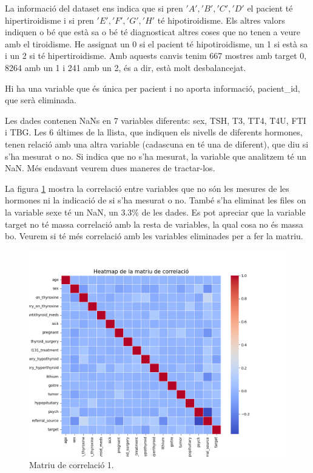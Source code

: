 \documentclass[9pt,a4paper,twoside]{tau-class/tau}
\begin{document}
    La informació del dataset ens indica que si pren $'A', 'B', 'C', 'D'$ el pacient té hipertiroidisme i si pren $'E', 'F', 'G', 'H'$ té hipotiroidisme. Els altres valors indiquen o bé que està sa o bé té diagnosticat altres coses que no tenen a veure amb el tiroidisme. He assignat un 0 si el pacient té hipotiroidisme, un 1 si està sa i un 2 si té hipertiroidisme. Amb aquests canvis tenim 667 mostres amb target 0, 8264 amb un 1 i 241 amb un 2, és a dir, està molt desbalancejat.
    
    Hi ha una variable que és única per pacient i no aporta informació, pacient\_id, que serà eliminada.

    Les dades contenen NaNs en 7 variables diferents: sex, TSH, T3, TT4, T4U, FTI i TBG. Les 6 últimes de la llista, que indiquen els nivells de diferents hormones, tenen relació amb una altra variable (cadascuna en té una de diferent), que diu si s'ha mesurat o no. Si indica que no s'ha mesurat, la variable que analitzem té un NaN. Més endavant veurem dues maneres de tractar-los.

    La figura \ref{fig:figure1} mostra la correlació entre variables que no són les mesures de les hormones ni la indicació de si s'ha mesurat o no. També s'ha eliminat les files on la variable sexe té un NaN, un 3.3\% de les dades. Es pot apreciar que la variable target no té massa correlació amb la resta de variables, la qual cosa no és massa bo. Veurem si té més correlació amb les variables eliminades per a fer la matriu.

    \begin{figure}[H]
		\centering
		\includegraphics[width=0.75\columnwidth]{correlation_matrix_atributs_no_mesures.png}
		\caption{Matriu de correlació 1.}
		\label{fig:figure1}
	\end{figure}
\end{document}

